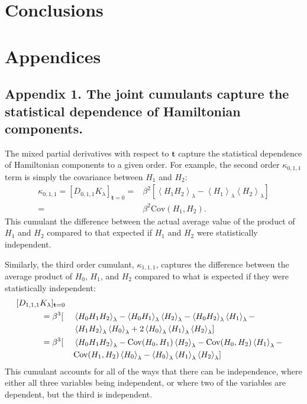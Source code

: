 \documentclass{article}
\let\vec\mathbf
\begin{document}
\section{Conclusions}

\section*{Appendices}
\subsection*{Appendix 1. The joint cumulants capture the statistical dependence of Hamiltonian components.}

The mixed partial derivatives with respect to $\vec t$ capture the statistical dependence of Hamiltonian components to a given order. For example, the second order $\kappa_{0,1,1}$ term is simply the covariance between $H_1$ and $H_2$:
\begin{align}
\kappa_{0, 1, 1} = [D_{0, 1, 1} K_\lambda]_{\vec t=0} =&
	\beta^2 \left[
    	\left\langle H_1 H_2 \right\rangle_\lambda -
		\left\langle H_1 \right\rangle_\lambda 
		\left\langle H_2 \right\rangle_\lambda
    \right] \nonumber\\
    =&
    \beta^2 \mathrm{Cov}(H_1,H_2).              
\end{align}
This cumulant the difference between the actual average value of the product of $H_1$ and $H_2$ compared to that expected if $H_1$ and $H_2$ were statistically independent.

Similarly, the third order cumulant, $\kappa_{1,1,1}$, captures the difference between the average product of $H_0$, $H_1$, and $H_2$ compared to what is expected if they were statistically independent:
\begin{alignat}{3}
\MoveEqLeft[3] [D_{1, 1, 1} K_\lambda]_{\vec t=0}\notag\\
&= \beta^3[ &&
\left\langle H_0 H_1 H_2 \right\rangle_\lambda -
\left\langle H_0 H_1 \right\rangle_\lambda
	\left\langle H_2 \right\rangle_\lambda -
\left\langle H_0 H_2 \right\rangle_\lambda
	\left\langle H_1 \right\rangle_\lambda - \notag\\
&&& \left\langle H_1 H_2 \right\rangle_\lambda
	\left\langle H_0 \right\rangle_\lambda +
2 \left\langle H_0 \right\rangle_\lambda
	\left\langle H_1 \right\rangle_\lambda
	\left\langle H_2 \right\rangle_\lambda]\notag\\
&= \beta^3[ &&
	\left\langle H_0 H_1 H_2 \right\rangle_\lambda -
	\mathrm{Cov}(H_0,H_1) \left\langle H_2 \right\rangle_\lambda -
	\mathrm{Cov}(H_0,H_2) \left\langle H_1 \right\rangle_\lambda -\\
	&&& \mathrm{Cov}(H_1,H_2) \left\langle H_0 \right\rangle_\lambda -
	\left\langle H_0 \right\rangle_\lambda
		\left\langle H_1 \right\rangle_\lambda
		\left\langle H_2 \right\rangle_\lambda]        
\end{alignat}
This cumulant accounts for all of the ways that there can be independence, where either all three variables being independent, or where two of the variables are dependent, but the third is independent.
\end{document}
